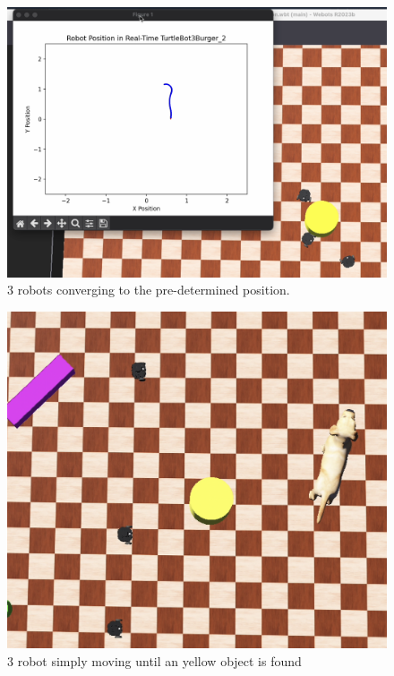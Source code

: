 \begin{figure}
    \centering
    \includegraphics[width=0.5\linewidth]{assets/images/simulation_overview/sim_2.png}
    \caption{3 robots converging to the pre-determined position.}
    \label{fig:simulation_overview2}
\end{figure}

\begin{figure}
    \centering
    \includegraphics[width=0.5\linewidth]{assets/images/simulation_overview/sim_3.png}
    \caption{3 robot simply moving until an yellow object is found}
    \label{simulation_overview3}
\end{figure}